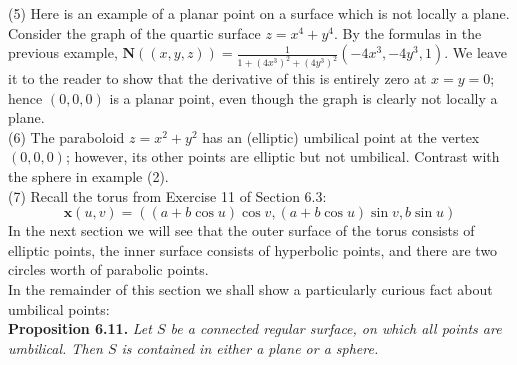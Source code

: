 \documentclass[leqno]{book}
\begin{document}
(5) Here is an example of a planar point on a surface which is not locally a plane.  Consider the graph of the quartic surface $z=x^4+y^4$.  By the formulas in the previous example, $\mathbf N((x,y,z))=\frac 1{1+(4x^3)^2+(4y^3)^2}(-4x^3,-4y^3,1)$.  We leave it to the reader to show that the derivative of this is entirely zero at $x=y=0$; hence $(0,0,0)$ is a planar point, even though the graph is clearly not locally a plane.\\

(6) The paraboloid $z=x^2+y^2$ has an (elliptic) umbilical point at the vertex $(0,0,0)$; however, its other points are elliptic but not umbilical.  Contrast with the sphere in example (2).\\

(7) Recall the torus from Exercise 11 of Section 6.3:
$$\mathbf x(u,v)=((a+b\cos u)\cos v,(a+b\cos u)\sin v,b\sin u)$$
In the next section we will see that the outer surface of the torus consists of elliptic points, the inner surface consists of hyperbolic points, and there are two circles worth of parabolic points.\\

\noindent In the remainder of this section we shall show a particularly curious fact about umbilical points:\\

\noindent\textbf{Proposition 6.11.} \emph{Let $S$ be a connected regular surface, on which all points are umbilical.  Then $S$ is contained in either a plane or a sphere.}\\
\end{document}

